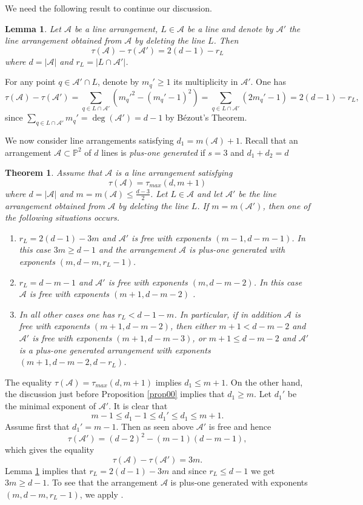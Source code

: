 \documentclass[12pt]{amsart}
\theoremstyle{plain}
\newtheorem{thm}[subsection]{Theorem}
\newtheorem{lem}[subsection]{Lemma}
\theoremstyle{definition}
\numberwithin{equation}{section}
\newcommand{\A}{{\mathcal A}}
\begin{document}
We need the following result to continue our discussion.

\begin{lem}
\label{lem01}
Let $\A$ be a line arrangement, $L \in \A$ be a line and denote by $\A'$ the line arrangement obtained from $\A$ by deleting the line $L$.
Then
$$\tau(\A)-\tau(\A')=2(d-1)-r_L$$
where $d=|\A|$ and $r_L=|L \cap \A'|$.
 \end{lem}
 \proof
 For any point $q \in \A' \cap L$, denote by $m_q'\geq 1$ its multiplicity in $\A'$. 
 One has
 $$\tau(\A)-\tau(\A')=\sum_{q \in L \cap \A'}(m_q'^2-(m_q'-1)^2)=\sum_{q \in L \cap \A'}(2m_q'-1)=2(d-1)-r_L,$$
 since $\sum_{q \in L \cap \A'}m_q'=\deg(\A')=d-1$ by B\'ezout's Theorem.
 \endproof
 
We now consider line arrangements satisfying $d_1=m(\A)+1$. Recall that an arrangement $\mathcal{A} \subset \mathbb{P}^{2}$ of $d$ lines is \textit{plus-one generated} if $s=3$ and $d_{1}+d_{2}=d$

 \begin{thm}
\label{thm02}
Assume that $\A$ is a line arrangement satisfying
$$\tau(\A)=\tau_{max}(d,m+1)$$
where $d=|\A|$ and $m=m(\A)\leq \frac{d-3}{2}$. Let $L \in \A$ and let $\A'$ be the line arrangement obtained from $\A$ by deleting the line $L$.
If $m=m(\A')$, then one of the following situations occurs.
\begin{enumerate} 

\item $r_L=2(d-1)-3m$ and $\A'$ is free with exponents $(m-1,d-m-1)$. In this case $3m \geq d-1$ and the arrangement $\A$ is plus-one generated with exponents $(m,d-m, r_L-1)$.

\item $r_L=d-m-1$ and $\A'$ is free with exponents $(m,d-m-2)$. In this case $\A$ is free with exponents $(m+1,d-m-2)$ .

\item In all other cases one has $r_L <d-1-m$. In particular, if in addition $\A$ is free with
exponents $(m+1,d-m-2)$, then either $m+1<d-m-2$ and $\A'$ is free with exponents $(m+1,d-m-3)$, or $m+1 \leq d-m-2$ and $\A'$ is a plus-one generated arrangement with exponents $(m+1,d-m-2, d-r_L)$.
\end{enumerate} 
\end{thm}
\proof
The equality $\tau(\A)=\tau_{max}(d,m+1)$ implies $d_1 \leq m+1$.
On the other hand, the discussion just before Proposition \ref{prop00} implies that $d_1 \geq m$.
Let $d_1'$ be the minimal exponent of $\A'$. It is clear that 
$$ m-1 \leq d_1-1 \leq d_1' \leq d_1 \leq m+1.$$
Assume first that  $d_1'=m-1$. Then as seen above
$\A'$ is free and hence
$$\tau(\A')= (d-2)^2-(m-1)(d-m-1),$$
which gives the equality
$$\tau(\A)-\tau(\A')=3m.$$
 Lemma \ref{lem01} implies that $r_L=2(d-1)-3m$ and since $r_L \leq d-1$ we get $3m \geq d-1$.
To see that the arrangement $\A$ is plus-one generated with exponents $(m,d-m,r_L-1)$, we apply \cite[Theorem 1.4 (3)]{POG}.
\end{document}
